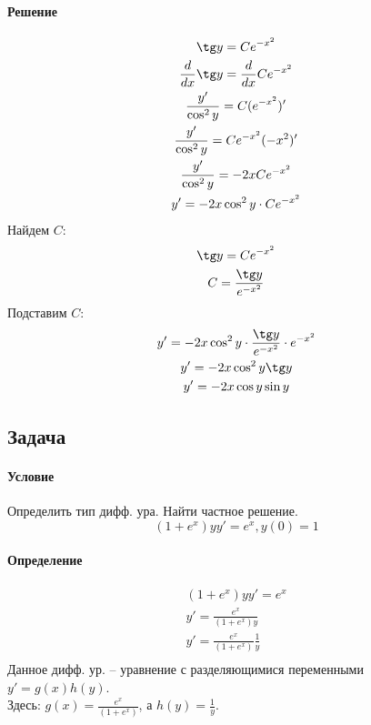 \paragraph{Решение}
\begin{gather*}
	\tg y = Ce^{-x^2} \\
	\frac{d}{dx} \tg y = \frac{d}{dx} Ce^{-x^2} \\
	\frac{y'}{\cos^2y} = C(e^{-x^2})' \\
	\frac{y'}{\cos^2y} = Ce^{-x^2}(-x^2)' \\
	\frac{y'}{\cos^2y} = -2xCe^{-x^2} \\
	y' = -2x\cos^2y \cdot Ce^{-x^2} \\
\end{gather*}
Найдем $C$:
\begin{gather*}
	\tg y = Ce^{-x^2} \\
	C = \frac{\tg y}{e^{-x^2}}
\end{gather*}
Подставим $C$:
\begin{gather*}
	y' = -2x\cos^2y \cdot \frac{\tg y}{e^{-x^2}} \cdot e^{-x^2} \\
	y' = -2x\cos^2y \tg y \\
	y' = -2x\cos y \sin y \\
\end{gather*}

\subsection{Задача }
\paragraph{Условие}
Определить тип дифф. ура. Найти частное решение.
\[(1 + e^x)yy' = e^x, y(0) = 1\]

\paragraph{Определение}
\begin{gather*}
	(1 + e^x)yy' = e^x \\
	y' = \frac{e^x}{(1 + e^x)y} \\
	y' = \frac{e^x}{(1 + e^x)} \frac{1}{y} \\
\end{gather*}
Данное дифф. ур. -- уравнение с разделяющимися переменными $y' = g(x)h(y)$. \\
Здесь: $g(x) = \frac{e^x}{(1 + e^x)}$, а $h(y) = \frac{1}{y}$.

